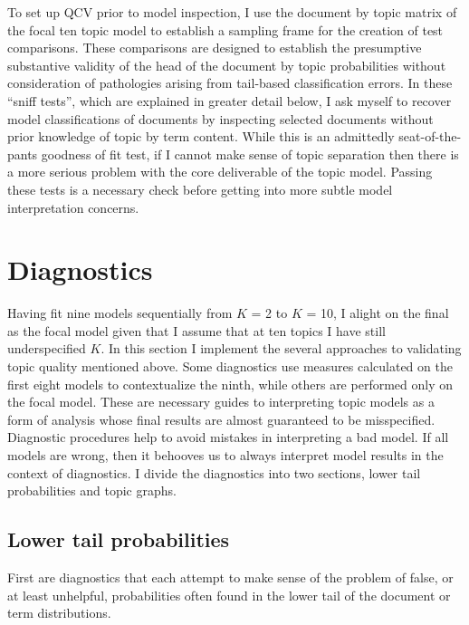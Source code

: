 \documentclass[]{book}
\theoremstyle{definition}
\theoremstyle{definition}
\theoremstyle{definition}
\theoremstyle{remark}
\begin{document}
To set up QCV prior to model inspection, I use the document by topic
matrix of the focal ten topic model to establish a sampling frame for
the creation of test comparisons. These comparisons are designed to
establish the presumptive substantive validity of the head of the
document by topic probabilities without consideration of pathologies
arising from tail-based classification errors. In these ``sniff tests'',
which are explained in greater detail below, I ask myself to recover
model classifications of documents by inspecting selected documents
without prior knowledge of topic by term content. While this is an
admittedly seat-of-the-pants goodness of fit test, if I cannot make
sense of topic separation then there is a more serious problem with the
core deliverable of the topic model. Passing these tests is a necessary
check before getting into more subtle model interpretation concerns.

\hypertarget{diagnostics}{%
\section{Diagnostics}\label{diagnostics}}

Having fit nine models sequentially from \(K\) = 2 to \(K\) = 10, I
alight on the final as the focal model given that I assume that at ten
topics I have still underspecified \(K\). In this section I implement
the several approaches to validating topic quality mentioned above. Some
diagnostics use measures calculated on the first eight models to
contextualize the ninth, while others are performed only on the focal
model. These are necessary guides to interpreting topic models as a form
of analysis whose final results are almost guaranteed to be
misspecified. Diagnostic procedures help to avoid mistakes in
interpreting a bad model. If all models are wrong, then it behooves us
to always interpret model results in the context of diagnostics. I
divide the diagnostics into two sections, lower tail probabilities and
topic graphs.

\hypertarget{lower-tail-probabilities}{%
\subsection{Lower tail probabilities}\label{lower-tail-probabilities}}

First are diagnostics that each attempt to make sense of the problem of
false, or at least unhelpful, probabilities often found in the lower
tail of the document or term distributions.
\end{document}
